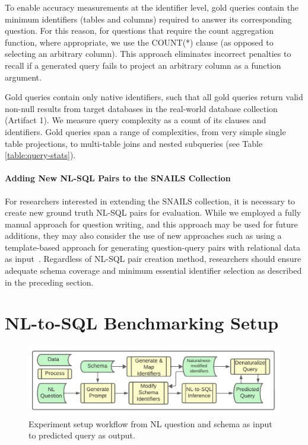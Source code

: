 To enable accuracy measurements at the identifier level, gold queries contain the minimum identifiers (tables and columns) required to answer its corresponding question.
For this reason, for questions that require the count aggregation function, where appropriate, we use the COUNT(*) clause (as opposed to selecting an arbitrary column).
This approach eliminates incorrect penalties to recall if a generated query fails to project an arbitrary column as a function argument.

Gold queries contain only native identifiers, such that all gold queries return valid non-null results from target databases in the real-world database collection (Artifact 1).
We measure query complexity as a count of its clauses and identifiers.
Gold queries span a range of complexities, from very simple single table projections, to multi-table joins and nested subqueries (see Table \ref{table:query-stats}).

\paragraph{\textbf{Adding New NL-SQL Pairs to the SNAILS Collection}}
For researchers interested in extending the SNAILS collection, it is necessary to create new ground truth NL-SQL pairs for evaluation. 
While we employed a fully manual approach for question writing, and this approach may be used for future additions, they may also consider the use of new approaches such as using a template-based approach for generating question-query pairs with relational data as input~\cite{10.5555/3666122.3667470}.
Regardless of NL-SQL pair creation method, researchers should ensure adequate schema coverage and minimum essential identifier selection as described in the preceding section.


\section{NL-to-SQL Benchmarking Setup}

\label{section:nl-to-sql-benchmarking-setup}

\begin{figure}[!h]
  \centering
  \includegraphics[width=\figwidthmod\linewidth]{figures/section-5-process-header.pdf}
  \caption{Experiment setup workflow from NL question and schema as input to predicted query as output.}
  \label{fig:section-5-process-header}
\end{figure}

